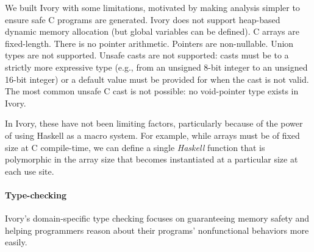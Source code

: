 We built Ivory with some limitations, motivated by making analysis simpler to
ensure safe C programs are generated.  Ivory does not support heap-based dynamic
memory allocation (but global variables can be defined).  C arrays are
fixed-length.  There is no pointer arithmetic.  Pointers are non-nullable.
Union types are not supported.  Unsafe casts are not supported: casts must be to
a strictly more expressive type (e.g., from an unsigned 8-bit integer to an
unsigned 16-bit integer) or a default value must be provided for when the cast
is not valid. The most common unsafe C cast is not possible: no void-pointer
type exists in Ivory.

In Ivory, these have not been limiting factors, particularly because of the
power of using Haskell as a macro system.  For example, while arrays must be of
fixed size at C compile-time, we can define a single \emph{Haskell} function
that is polymorphic in the array size that becomes instantiated at a particular
size at each use site.  %


\paragraph{Type-checking}
Ivory's domain-specific type checking focuses on guaranteeing memory
safety and helping programmers reason about their programs' nonfunctional
behaviors more easily.



